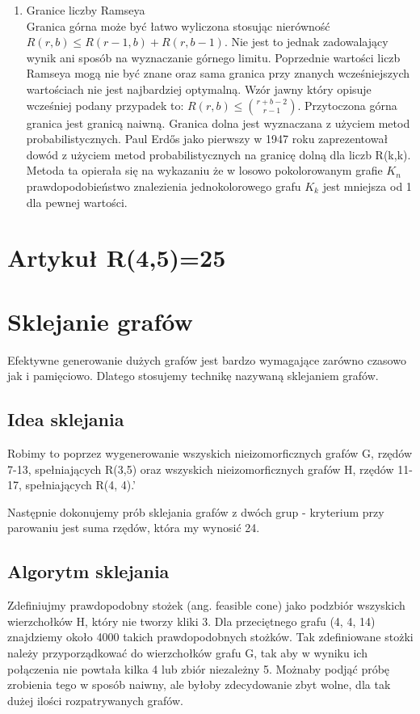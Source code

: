 \documentclass[11pt]{article}
\begin{document}
\begin{enumerate}
\item Granice liczby Ramseya \hfill \\

Granica górna może być łatwo wyliczona stosując nierówność $R(r,b) \le R(r-1,b)+R(r,b-1)$. Nie jest to jednak zadowalający wynik ani sposób na wyznaczanie górnego limitu. Poprzednie wartości liczb Ramseya mogą nie być znane oraz sama granica przy znanych wcześniejszych wartościach nie jest najbardziej optymalną. Wzór jawny który opisuje wcześniej podany przypadek to: $R(r,b) \le {r+b-2\choose r-1}$. Przytoczona górna granica jest granicą naiwną. Granica dolna jest wyznaczana z użyciem metod probabilistycznych. Paul Erdős jako pierwszy w 1947 roku zaprezentował dowód z użyciem metod probabilistycznych na granicę dolną dla liczb R(k,k). Metoda ta opierała się na wykazaniu że w losowo pokolorowanym grafie $\mathit{K}_{n}$ prawdopodobieństwo znalezienia jednokolorowego grafu $\mathit{K}_{k}$ jest mniejsza od 1 dla pewnej wartości.

\end{enumerate}

\section{Artykuł R(4,5)=25}

\section{Sklejanie grafów}
Efektywne generowanie dużych grafów jest bardzo wymagające zarówno czasowo jak i pamięciowo. Dlatego stosujemy technikę nazywaną sklejaniem grafów. 

\subsection{Idea sklejania}
Robimy to poprzez wygenerowanie wszyskich nieizomorficznych grafów G, rzędów 7-13, spełniających R(3,5) oraz wszyskich
nieizomorficznych grafów H, rzędów 11-17, spełniających R(4, 4).'

Następnie dokonujemy prób sklejania grafów z dwóch grup - kryterium przy parowaniu jest suma rzędów, która my wynosić 24. 

\subsection{Algorytm sklejania}
Zdefiniujmy prawdopodobny stożek (ang. feasible cone) jako podzbiór wszyskich wierzchołków H, który nie tworzy kliki 3.
Dla przeciętnego grafu (4, 4, 14) znajdziemy około 4000 takich prawdopodobnych stożków. 
Tak zdefiniowane stożki należy przyporządkować do wierzchołków  grafu G, tak aby w wyniku ich połączenia nie powtała kilka 4 lub zbiór niezależny 5.
Możnaby podjąć próbę zrobienia tego w sposób naiwny, ale byłoby zdecydowanie zbyt wolne, dla tak dużej ilości rozpatrywanych grafów.
\end{document}
